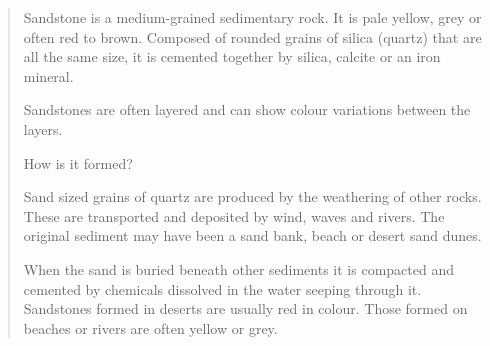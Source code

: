 \blockquote{
	Sandstone is a medium-grained sedimentary rock. It is pale yellow, grey or often red to brown. Composed of rounded grains of silica (quartz) that are all the same size, it is cemented together by silica, calcite or an iron mineral.

	Sandstones are often layered and can show colour variations between the layers.

	How is it formed?

	Sand sized grains of quartz are produced by the weathering of other rocks. These are transported and deposited by wind, waves and rivers. The original sediment may have been a sand bank, beach or desert sand dunes.

	When the sand is buried beneath other sediments it is compacted and cemented by chemicals dissolved in the water seeping through it. Sandstones formed in deserts are usually red in colour. Those formed on beaches or rivers are often yellow or grey.
}

